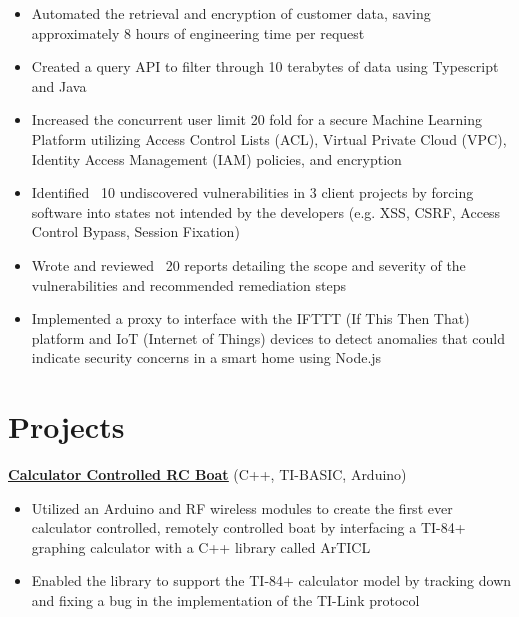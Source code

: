 \documentclass[letterpaper,11pt]{article}
\begin{document}
\begin{itemize}
    \item Automated the retrieval and encryption of customer data, saving approximately 8 hours of engineering time per request
    \item Created a query API to filter through 10 terabytes of data using Typescript and Java
    \item Increased the concurrent user limit 20 fold for a secure Machine Learning Platform utilizing Access Control Lists (ACL), Virtual Private Cloud (VPC), Identity Access Management (IAM) policies, and encryption

\end{itemize}

\begin{itemize}
    \item Identified ~10 undiscovered vulnerabilities in 3 client projects by forcing software into states not intended by the developers (e.g. XSS, CSRF, Access Control Bypass, Session Fixation)
    \item Wrote and reviewed ~20 reports detailing the scope and severity of the vulnerabilities and recommended remediation steps 
\end{itemize}

\begin{itemize}
    \item Implemented a proxy to interface with the IFTTT (If This Then That) platform and IoT (Internet of Things) devices to detect anomalies that could indicate security concerns in a smart home using Node.js
\end{itemize}

\section{Projects}

\textbf{\href{https://github.com/jshin313/CalcControlledBoat}{\underline{Calculator Controlled RC Boat}}} \hfill (C++, TI-BASIC, Arduino)
\begin{itemize}
    \item Utilized an Arduino and RF wireless modules to create the first ever calculator controlled, remotely controlled boat by interfacing a TI-84+ graphing calculator with a C++ library called ArTICL
    \item Enabled the library to support the TI-84+ calculator model by tracking down and fixing a bug in the implementation of the TI-Link protocol
\end{itemize}
\end{document}
